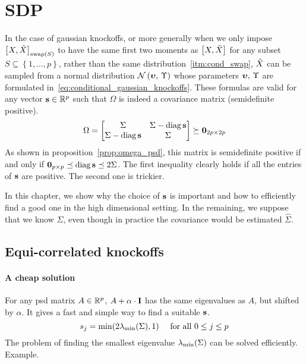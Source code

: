 \chapter{SDP}\label{ch:sdp}

In the case of gaussian knockoffs,
or more generally when we only impose
$\big[ X, \tilde{X} \big]_{\operatorname{swap}\left( S \right)}$
to have the same first two moments as
$\big[ X, \tilde{X} \big]$
for any subset
$S \subseteq \left\{ 1, \dots, p \right\}$,
rather than the same distribution~\ref{itm:cond_swap},
$\tilde{X}$ can be sampled from a normal distribution $\mathcal{N}\left( \bm{\upsilon},\, \Upsilon \right)$ whose parameters
$\bm{\upsilon},\, \Upsilon$ are formulated in~\ref{eq:conditional_gaussian_knockoffs}.
These formulas are valid for any vector $\mathbf{s} \in \mathbb{R}^p$ such that $\Omega$
is indeed a covariance matrix (semidefinite positive).
\begin{equation*}
    \Omega = \begin{bmatrix}
        \Sigma & \Sigma - \operatorname*{diag} \mathbf{s}\\
        \Sigma - \operatorname*{diag} \mathbf{s} & \Sigma
    \end{bmatrix}
    \succeq \mathbf{0}_{2p \times 2p}
\end{equation*}
As shown in proposition~\ref{prop:omega_psd},
this matrix is semidefinite positive if and only if $\mathbf{0}_{p \times p} \preceq \operatorname*{diag} \mathbf{s} \preceq 2 \Sigma$.
The first inequality clearly holds if all the entries of $\mathbf{s}$ are positive.
The second one is trickier.

In this chapter, we show why the choice of $\mathbf{s}$ is important and how to efficiently find a good one
in the high dimensional setting.
In the remaining, we suppose that we know $\Sigma$, even though in practice the covariance would be
estimated $\hat{\Sigma}$.

\section{Equi-correlated knockoffs}\label{sec:equi}

\subsubsection{A cheap solution}

For any psd matrix $A \in \mathbb{R}^p$, $A + \alpha \cdot \mathbf{I}$ has the same eigenvalues as $A$, but shifted by $\alpha$.
It gives a fast and simple way to find a suitable $\mathbf{s}$.
\begin{equation}\label{eq:equi}
    s_j = \min(2\lambda_{\min}(\Sigma), 1)
    \quad\text{ for all } 0 \leq j \leq p
\end{equation}
The problem of finding the smallest eigenvalue $\lambda_{\min}(\Sigma)$ can be solved efficiently.
Example.

